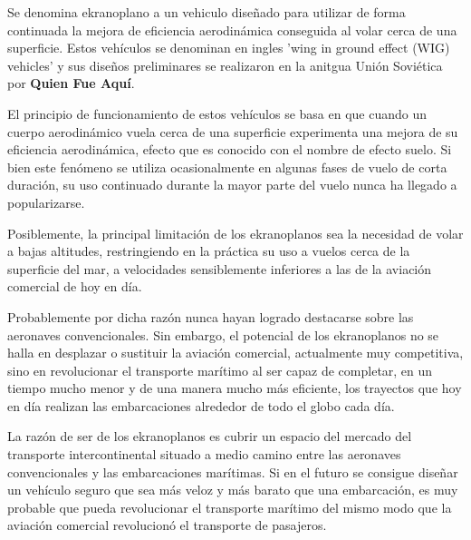 Se denomina ekranoplano a un vehiculo diseñado para utilizar de forma continuada la mejora de eficiencia aerodinámica conseguida al volar cerca de una superficie. Estos vehículos se denominan en ingles 'wing in ground effect (WIG) vehicles' y sus diseños preliminares se realizaron en la anitgua Unión Soviética por \textbf{Quien Fue Aquí}.


El principio de funcionamiento de estos vehículos se basa en que cuando un cuerpo aerodinámico vuela cerca de una superficie experimenta una mejora de su eficiencia aerodinámica, efecto que es conocido con el nombre de efecto suelo. Si bien este fenómeno se utiliza ocasionalmente en algunas fases de vuelo de corta duración, su uso continuado durante la mayor parte del vuelo nunca ha llegado a popularizarse.


Posiblemente, la principal limitación de los ekranoplanos sea la necesidad de volar a bajas altitudes,
 restringiendo en la práctica su uso a vuelos cerca de la superficie del mar, a velocidades sensiblemente inferiores a las de la aviación comercial de hoy en día.

Probablemente por dicha razón nunca hayan logrado destacarse sobre las aeronaves convencionales. Sin embargo, el potencial de los ekranoplanos no se halla en desplazar o sustituir la aviación comercial, actualmente muy competitiva, sino en revolucionar el transporte marítimo al ser capaz de completar, en un tiempo mucho menor y de una manera mucho más eficiente, los trayectos que hoy en día realizan las embarcaciones alrededor de todo el globo cada día.


La razón de ser de los ekranoplanos es cubrir un espacio del mercado del transporte intercontinental situado a medio camino entre las aeronaves convencionales y las embarcaciones marítimas. Si en el futuro se consigue diseñar un vehículo seguro que sea más veloz y más barato que una embarcación, es muy probable que pueda revolucionar el transporte marítimo del mismo modo que la aviación comercial revolucionó el transporte de pasajeros.

